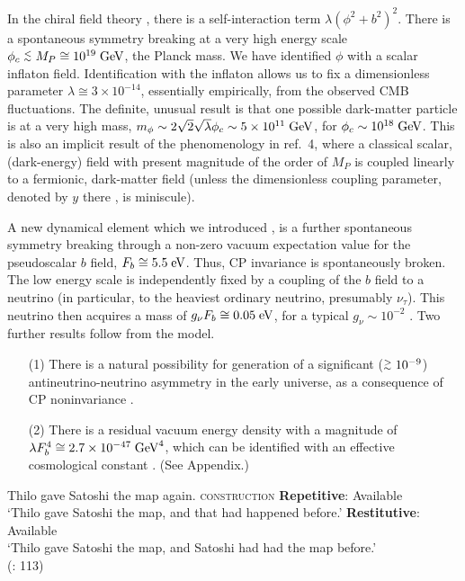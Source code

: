 In the chiral field theory \cite{ref5,ref6}, there is a self-interaction term $\lambda(\phi^2+b^2)^2$. There is
a spontaneous symmetry breaking at a very high energy scale $\phi_c\stackrel{<}{{}_\sim} M_P \cong 10^{19}\;\mbox{GeV}$, the
Planck mass. We have identified $\phi$ with a scalar inflaton field. \cite{ref1,ref2}
Identification
with the inflaton allows us to fix a dimensionless parameter $\lambda  \cong 3\times 10^{-14}$, 
essentially
empirically, \cite{ref7,ref8} from the observed CMB fluctuations. The definite, unusual 
result is that one possible dark-matter particle is at a very high mass, $m_\phi \sim 2\sqrt{2}\sqrt{\lambda}
\phi_c \sim 5\times 10^{11}\;\mbox{GeV}$, for $\phi_c\sim 10^{18}\;\mbox{GeV}$.\cite{ref2} This is also an implicit result of the phenomenology in ref.~4, where a 
classical scalar, (dark-energy) field with present magnitude of the order of $M_P$ is coupled linearly to a
fermionic, dark-matter field (unless the dimensionless coupling parameter, denoted by $y$ there \cite{ref4}, is
miniscule).

A new dynamical element which we introduced \cite{ref1}, is a further spontaneous symmetry breaking through 
a non-zero vacuum expectation value for the pseudoscalar $b$ field, $F_b\cong 5.5\;\mbox{eV}$. Thus, CP invariance is 
spontaneously broken. The low energy scale is independently fixed by a coupling of the $b$ field to a neutrino
(in particular, to the heaviest ordinary neutrino, presumably $\nu_\tau$). This neutrino then acquires a mass
of $g_\nu F_b \cong 0.05\;\mbox{eV}$, for a typical $g_\nu \sim 10^{-2}$ \cite{ref2}. Two further results follow from
the model.
\begin{itemize}
\item[(1)] There is a natural possibility for generation of a significant ($\stackrel{>}{{}_\sim} 10^{-9}$) antineutrino-neutrino
asymmetry in the early universe, as a consequence of CP noninvariance \cite{ref1}.
\item[(2)] There is a residual vacuum energy density with a magnitude of $\lambda F_b^4 \cong 2.7\times 10^{-47}\;\mbox{GeV}^4$,
which can be identified with an effective cosmological constant \cite{ref1}. (See Appendix.)
\end{itemize}



 \ea\label{ex:bondarenko:3}{Thilo gave Satoshi the map again.}\hfill\textsc{ construction}
\ea \textbf{Repetitive}: Available\\`Thilo gave Satoshi the map, and that had happened before.'
\ex \textbf{Restitutive}: Available\\`Thilo gave Satoshi the map, and Satoshi had had the map before.'\\
\hfill(\citealt{Beck-Johnson2004}: 113)
\z
\z

